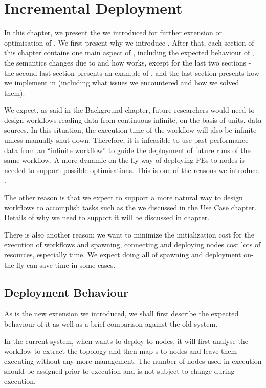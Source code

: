 \newcommand{\defNode}[1]{%
  \expandafter\def\csname nd#1\endcsname{\emph{#1}\xspace}}
\newcommand{\defNodes}[1]{\forcsvlist{\defNode}{#1}}

\chapter{Incremental Deployment}
In this chapter, we present the \tincdep we introduced for further extension or optimisation of \dpy. We first present why we introduce \tincdep. After that, each section of this chapter contains one main aspect of \tincdep, including the expected behaviour of \tincdep, the semantics changes due to \tincdep and how \tincdep works, except for the last two sections - the second last section presents an example of \tincdep, and the last section presents how we implement \tincdep in \dpy (including what issues we encountered and how we solved them).

We expect, as said in the Background chapter, future researchers would need to design workflows reading data from continuous infinite, on the basis of units, data sources. In this situation, the execution time of the workflow will also be infinite unless manually shut down. Therefore, it is infeasible to use past performance data from an ``infinite workflow'' to guide the deployment of future runs of the same workflow. A more dynamic on-the-fly way of deploying PEs to nodes is needed to support possible optimisations. This is one of the reasons we introduce \tincdep.

The other reason is that we expect to support a more natural way to design workflows to accomplish tasks such as the \tsieve we discussed in the Use Case chapter. Details of why we need \tincdep to support it will be discussed in \tDynExp chapter.

There is also another reason: we want to minimize the initialization cost for the execution of workflows and spawning, connecting and deploying nodes cost lots of resources, especially time. We expect doing all of spawning and deployment on-the-fly can save time in some cases.

\section{Deployment Behaviour}
As \tincdep is the new extension we introduced, we shall first describe the expected behaviour of it as well as a brief comparison against the old system.

In the current \dpy system, when \dpy wants to deploy \tPEInst to nodes, it will first analyse the workflow to extract the topology and then map \tPEInst{}s to nodes and leave them executing without any more management. The number of nodes used in execution should be assigned prior to execution and is not subject to change during execution.

